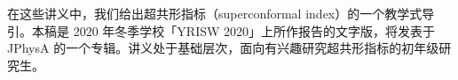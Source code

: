 \par
{}
\vspace{0.4em}

在这些讲义中，我们给出超共形指标（superconformal index）的一个教学式导引。本稿是 2020 年冬季学校「YRISW 2020」上所作报告的文字版，将发表于 JPhysA 的一个专辑。讲义处于基础层次，面向有兴趣研究超共形指标的初年级研究生。

